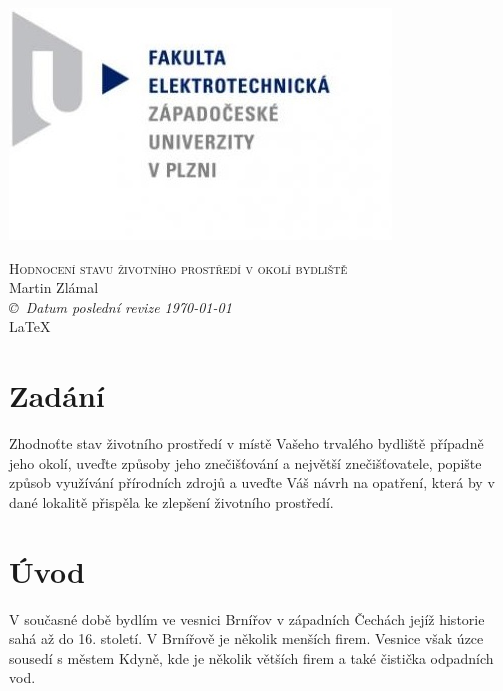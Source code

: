 \documentclass[12pt]{article} %
\newcommand{\bigsize}{\fontsize{35pt}{20pt}\selectfont}
\begin{document}
\begin{titlepage}
	\includegraphics[scale=0.7]{logo.jpg}
	\vspace*{\fill}
	\begin{center}
		\textsc{\LARGE \bigsize Hodnocení stavu životního prostředí v okolí bydliště}\\[1cm]
		Martin Zlámal \\[1cm]
		{\small\em \copyright \ Datum poslední revize \today } \\
		\LaTeX
	\end{center}
	\vspace*{\fill}
\end{titlepage}
\tableofcontents
\listoffigures
\newpage


\section{Zadání}
Zhodnoťte stav životního prostředí v místě Vašeho trvalého bydliště případně jeho okolí, uveďte způsoby jeho znečišťování a největší znečišťovatele, popište způsob využívání přírodních zdrojů a uveďte Váš návrh na opatření, která by v dané lokalitě přispěla ke zlepšení životního prostředí.

\section{Úvod}
V současné době bydlím ve vesnici Brnířov v západních Čechách jejíž historie sahá až do 16. století. V Brnířově je několik menších firem. Vesnice však úzce sousedí s městem Kdyně, kde je několik větších firem a také čistička odpadních vod.
\end{document}
